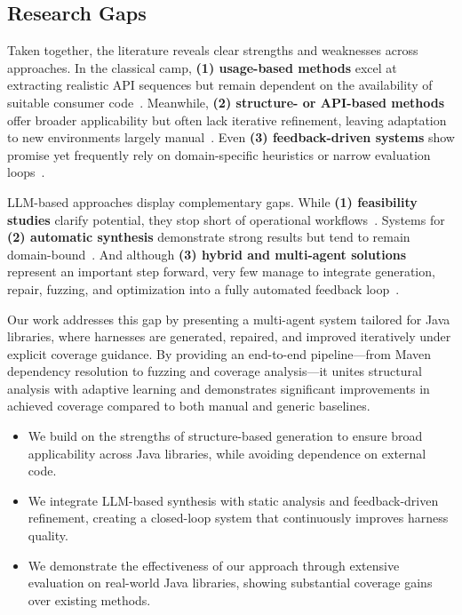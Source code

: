 \subsection{Research Gaps}
\label{subsec:research-gaps}

Taken together, the literature reveals clear strengths and weaknesses across approaches. In the classical camp, \textbf{(1) usage-based methods} excel at extracting realistic API sequences but remain dependent on the availability of suitable consumer code~\cite{DBLP:conf/sigsoft/BabicBCIKKLSW19:FUDGE, DBLP:conf/uss/IspoglouAMP20:FuzzGen, DBLP:conf/sp/JeongJYMKJKSH23:UTopia}. Meanwhile, \textbf{(2) structure- or API-based methods} offer broader applicability but often lack iterative refinement, leaving adaptation to new environments largely manual~\cite{DBLP:conf/icse/GreenA22:GraphFuzz, DBLP:conf/ccs/ChenXLWC23:Hopper, DBLP:conf/ndss/0007ZLSZLQ25:NEXZZER}. Even \textbf{(3) feedback-driven systems} show promise yet frequently rely on domain-specific heuristics or narrow evaluation loops~\cite{DBLP:conf/uss/ZhangLZZZZXLL0H23:Rubick, DBLP:conf/icse/ShermanN25:OGHarn}.

LLM-based approaches display complementary gaps. While \textbf{(1) feasibility studies} clarify potential, they stop short of operational workflows~\cite{DBLP:conf/issta/ZhangZBLMXLSL24:HowEffectiveAreThey, DBLP:conf/sigsoft/Jiang0MCZSWFWLZ24:WhenFuzzingMeetsLLMs}. Systems for \textbf{(2) automatic synthesis} demonstrate strong results but tend to remain domain-bound~\cite{DBLP:conf/ccs/LyuXCC24:PromptFuzz, DBLP:journals/corr/abs-2507-15058:LibLMFuzz, DBLP:journals/corr/abs-2506-15648:deepSURF, DBLP:journals/cybersec/LiuLZZLL25:LLM4TDG}. And although \textbf{(3) hybrid and multi-agent solutions} represent an important step forward, very few manage to integrate generation, repair, fuzzing, and optimization into a fully automated feedback loop~\cite{DBLP:conf/icse/XuMZZCHLW25:CKGFuzzer, DBLP:journals/corr/abs-2507-18289:Scheduzz, DBLP:journals/corr/abs-2505-03425:HGFuzzer}.

Our work addresses this gap by presenting a multi-agent system tailored for Java libraries, where harnesses are generated, repaired, and improved iteratively under explicit coverage guidance. By providing an end-to-end pipeline—from Maven dependency resolution to fuzzing and coverage analysis—it unites structural analysis with adaptive learning and demonstrates significant improvements in achieved coverage compared to both manual and generic baselines.
\begin{itemize}
    \item We build on the strengths of structure-based generation to ensure broad applicability across Java libraries, while avoiding dependence on external code.
    \item We integrate LLM-based synthesis with static analysis and feedback-driven refinement, creating a closed-loop system that continuously improves harness quality.
    \item We demonstrate the effectiveness of our approach through extensive evaluation on real-world Java libraries, showing substantial coverage gains over existing methods.
\end{itemize}